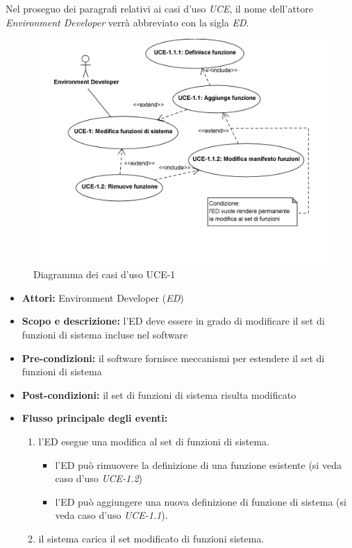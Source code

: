 
Nel proseguo dei paragrafi relativi ai casi d'uso \emph{UCE}, il nome dell'attore \emph{Environment Developer} verrà abbreviato con la sigla \emph{ED}.

\begin{figure}
\centering
\includegraphics[width=1.1\textwidth]{Immagini/Capitolo2/UseCases/UCE-1.png}
\caption{Diagramma dei casi d'uso UCE-1}\label{fig:uc-uce-1}
\end{figure}


\begin{itemize}
	\item \textbf{Attori:} Environment Developer (\emph{ED})
	\item \textbf{Scopo e descrizione:} l'ED deve essere in grado di modificare il set di funzioni di sistema incluse nel software
	\item \textbf{Pre-condizioni:} il software fornisce meccanismi per estendere il set di funzioni di sistema
	\item \textbf{Post-condizioni:} il set di funzioni di sistema risulta modificato
	\item \textbf{Flusso principale degli eventi:}
		\begin{enumerate}
			\item l'ED esegue una modifica al set di funzioni di sistema.
			\begin{itemize}
				\item l'ED può rimuovere la definizione di una funzione esistente (si veda caso d'uso \emph{UCE-1.2})
				\item l'ED può aggiungere una nuova definizione di funzione di sistema (si veda caso d'uso \emph{UCE-1.1}).
			\end{itemize}
			\item il sistema carica il set modificato di funzioni sistema.
		\end{enumerate}
\end{itemize}


